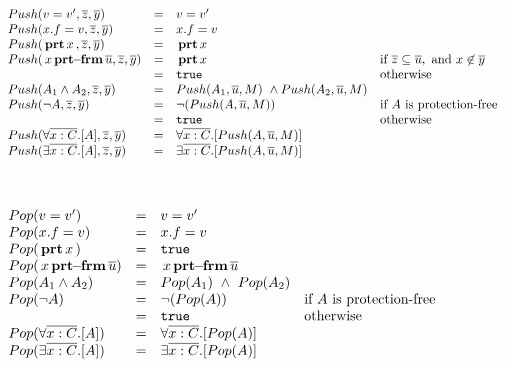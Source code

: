 $\begin{array}{lcll}
\push {v=v'} {\overline z} {\overline y}  & = & v=v' 
\\
\push {x.f=v} {\overline z} {\overline y} & = & x.f=v 
\\
\push{ \inside x}  {\overline z} {\overline y}  & = &   \inside x 
\\
\push{ \protectedFrom x {\overline {u}} }  {\overline z} {\overline y}  & = &   \inside x & \mbox{if } {\overline z}\subseteq {\overline {u}}, \mbox{ and } x\not\in \overline{y}
\\
   & = &   \prg{true} & \mbox{otherwise}

\\
\push {A_1 \wedge A_2} {\overline z} {\overline y}  & = & \push { A_1} {\overline u} M  \ \wedge \push {A_2} {\overline u} M  
\\
\push {\neg A} {\overline z} {\overline y}  & = & \neg (\push {A} {\overline u} M)& \mbox{if  $A$ is protection-free}
\\
  & = &  \prg{true} & \mbox{otherwise}
\\
\push {\forall \overline{x:C}.[ A ]} {\overline z} {\overline y}  & = & \forall \overline{x:C}.[ \push A  {\overline u} M ] & 
\\
\push {\exists \overline{x:C}.[ A ]} {\overline z} {\overline y}  & = & \exists \overline{x:C}.[ \push A  {\overline u} M ] & 
\end{array}
$

$\begin{array}{lcll}
\\
\\
\pop {v=v'}   & = & v=v' 
\\
\pop {x.f=v}  & = & x.f=v 
\\
\pop{ \inside x}   & = &   \prg{true}
\\
\pop{ \protectedFrom x {\overline {u}} }    & = &     \protectedFrom x {\overline {u}}  
\\
\pop {A_1 \wedge A_2}   & = & \pop { A_1}   \ \wedge\ \pop {A_2}    
\\
\pop {\neg A}    & = & \neg (\pop  {A} ) & \mbox{if  $A$ is protection-free}
\\
  & = &  \prg{true} & \mbox{otherwise}
\\
\pop {\forall \overline{x:C}.[ A ]}    & = & \forall \overline{x:C}.[ \pop A    ] & 
\\
\pop {\exists \overline{x:C}.[ A ]}   & = & \exists \overline{x:C}.[ \pop A   ] & 
\end{array}
$

